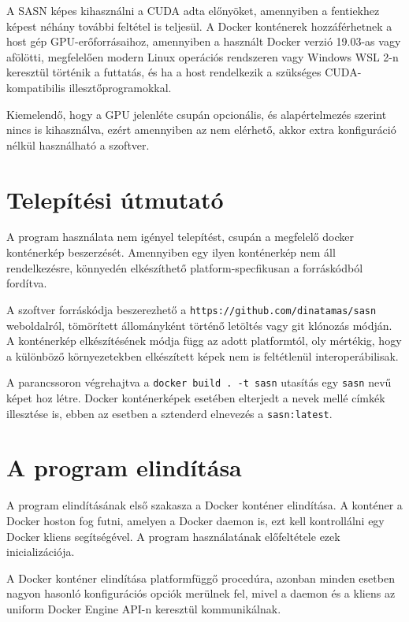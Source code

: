\documentclass[twoside, 12pt]{report}
\begin{document}

A SASN képes kihasználni a CUDA adta előnyöket, amennyiben a fentiekhez képest néhány további feltétel is teljesül. A Docker konténerek hozzáférhetnek a host gép GPU-erőforrásaihoz, amennyiben a használt Docker verzió 19.03-as vagy afölötti, megfelelően modern Linux operációs rendszeren vagy Windows WSL 2-n keresztül történik a futtatás, és ha a host rendelkezik a szükséges CUDA-kompatibilis illesztőprogramokkal.

Kiemelendő, hogy a GPU jelenléte csupán opcionális, és alapértelmezés szerint nincs is kihasználva, ezért amennyiben az nem elérhető, akkor extra konfiguráció nélkül használható a szoftver.

\section{Telepítési útmutató}

A program használata nem igényel telepítést, csupán a megfelelő docker konténerkép beszerzését. Amennyiben egy ilyen konténerkép nem áll rendelkezésre, könnyedén elkészíthető platform-specfikusan a forráskódból fordítva.

A szoftver forráskódja beszerezhető a \verb|https://github.com/dinatamas/sasn| weboldalról, tömörített állományként történő letöltés vagy git klónozás módján. A konténerkép elkészítésének módja függ az adott platformtól, oly mértékig, hogy a különböző környezetekben elkészített képek nem is feltétlenül interoperábilisak.

A parancssoron végrehajtva a \verb|docker build . -t sasn| utasítás egy \verb|sasn| nevű képet hoz létre. Docker konténerképek esetében elterjedt a nevek mellé címkék illesztése is, ebben az esetben a sztenderd elnevezés a \verb|sasn:latest|.

\section{A program elindítása}

A program elindításának első szakasza a Docker konténer elindítása. A konténer a Docker hoston fog futni, amelyen a Docker daemon is, ezt kell kontrollálni egy Docker kliens segítségével. A program használatának előfeltétele ezek inicializációja.

A Docker konténer elindítása platformfüggő procedúra, azonban minden esetben nagyon hasonló konfigurációs opciók merülnek fel, mivel a daemon és a kliens az uniform Docker Engine API-n keresztül kommunikálnak.
\end{document}
